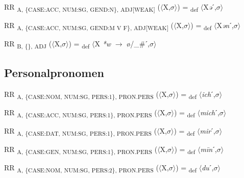 {\begin{exe}
 RR \textsubscript{A, \{CASE:ACC, NUM:SG, GEND:N\}, ADJ[WEAK]} ($\langle$X,$\sigma $$\rangle$) = \textsubscript{def} $\langle$X\textit{ə}ˊ,$\sigma $$\rangle$
\end{exe}

\begin{exe}
 RR \textsubscript{A, \{CASE:ACC, NUM:SG, GEND:M V F\}, ADJ[WEAK]} ($\langle$X,$\sigma $$\rangle$) = \textsubscript{def} $\langle$X\textit{ən}ˊ,$\sigma $$\rangle$
\end{exe}

\begin{exe}
 RR \textsubscript{B, \{\}, ADJ} ($\langle$X,$\sigma $$\rangle$) = \textsubscript{def} $\langle$X \textit{*w} $\rightarrow$ ø/\_\#ˊ,$\sigma $$\rangle$
\end{exe}

\subsection{Personalpronomen}

\begin{exe}
 RR \textsubscript{A, \{CASE:NOM, NUM:SG, PERS:1\}, PRON.PERS} ($\langle$X,$\sigma $$\rangle$) = \textsubscript{def} $\langle$\textit{ich}ˊ,$\sigma $$\rangle$
\end{exe}

\begin{exe}
 RR \textsubscript{A, \{CASE:ACC, NUM:SG, PERS:1\}, PRON.PERS} ($\langle$X,$\sigma $$\rangle$) = \textsubscript{def} $\langle$\textit{mich}ˊ,$\sigma $$\rangle$
\end{exe}

\begin{exe}
 RR \textsubscript{A, \{CASE:DAT, NUM:SG, PERS:1\}, PRON.PERS} ($\langle$X,$\sigma $$\rangle$) = \textsubscript{def} $\langle$\textit{mir}ˊ,$\sigma $$\rangle$
\end{exe}

\begin{exe}
 RR \textsubscript{A, \{CASE:GEN, NUM:SG, PERS:1\}, PRON.PERS} ($\langle$X,$\sigma $$\rangle$) = \textsubscript{def} $\langle$\textit{m\=in}ˊ,$\sigma $$\rangle$
\end{exe}

\begin{exe}
 RR \textsubscript{A, \{CASE:NOM, NUM:SG, PERS:2\}, PRON.PERS} ($\langle$X,$\sigma $$\rangle$) = \textsubscript{def} $\langle$\textit{du}ˊ,$\sigma $$\rangle$
\end{exe}

}
